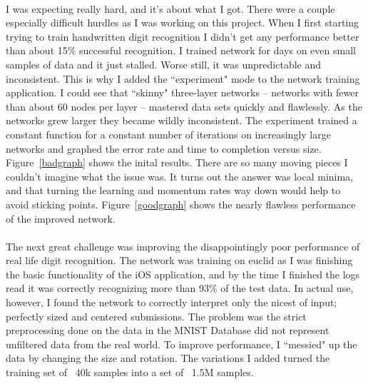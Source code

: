 \documentclass{article}
\begin{document}
    \paragraph{}I was expecting really hard, and it's about what I got. There were 
    a couple especially difficult hurdles as I was working on this project. When I
    first starting trying to train handwritten digit recognition I didn't
    get any performance better than about 15\% successful recognition. I trained
    network for days on even small samples of data and it just stalled. Worse 
    still, it was unpredictable and inconsistent. This is why I added the 
    ``experiment" mode to the network training application. I could see that 
    ``skinny" three-layer networks -- networks with fewer than about 60 nodes per 
    layer -- mastered data sets quickly and flawlessly. As the networks grew larger
    they became wildly inconsistent. The experiment trained a constant function for
    a constant number of iterations on increasingly large networks and graphed the 
    error rate and time to completion versus size. Figure~\ref{badgraph} shows the 
    inital results. There are so many moving pieces I couldn't imagine what the 
    issue was. It turns out the answer was local minima, and that turning the 
    learning and momentum rates way down would help to avoid sticking points.
    Figure~\ref{goodgraph} shows the nearly flawless performance of the improved 
    network.

    \paragraph{}The next great challenge was improving the disappointingly poor 
    performance of real life digit recognition. The network was training on euclid 
    as I was finishing the basic functionality of the iOS application, and by the 
    time I finished the logs read it was correctly recognizing more than 93\% of 
    the test data. In actual use, however, I found the network to correctly 
    interpret only the nicest of input; perfectly sized and centered submissions.
    The problem was the strict preprocessing done on the data in the MNIST Database
    did not represent unfiltered data from the real world. To improve performance,
    I ``messied" up the data by changing the size and rotation. The variations I 
    added turned the training set of ~40k samples into a set of ~1.5M samples. 
\end{document}
